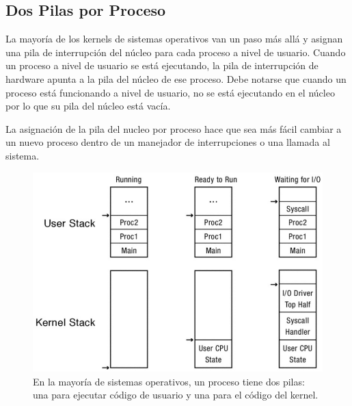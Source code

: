 \documentclass[10pt]{book}
\begin{document}
\subsection{Dos Pilas por Proceso}
La mayoría de los kernels de sistemas operativos van un paso más allá y asignan una pila de interrupción del núcleo para cada proceso a nivel de usuario. Cuando un proceso a nivel de usuario se está ejecutando, la pila de interrupción de hardware apunta a la pila del núcleo de ese proceso. Debe notarse que cuando un proceso está funcionando a nivel de usuario, no se está ejecutando en el núcleo por lo que su pila del núcleo está vacía.

La asignación de la pila del nucleo por proceso hace que sea más fácil cambiar a un nuevo proceso dentro de un manejador de interrupciones o una llamada al sistema.

\begin{figure}[tbhp]
\centerline{\includegraphics[scale=0.55]{img/fig0205}}
\caption{En la mayoría de sistemas operativos, un proceso tiene dos pilas: una para ejecutar código de usuario y una para el código del kernel.}
\label{fig0205}
\end{figure}
\end{document}
